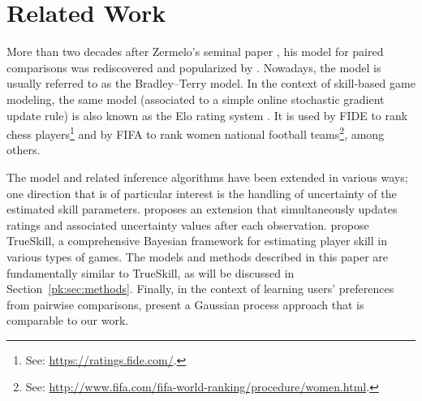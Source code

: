 \section{Related Work}
\label{pk:sec:relwork}

More than two decades after Zermelo's seminal paper \citep{zermelo1928berechnung}, his model for paired comparisons was rediscovered and popularized by \citet{bradley1952rank}.
Nowadays, the model is usually referred to as the Bradley--Terry model.
In the context of skill-based game modeling, the same model (associated to a simple online stochastic gradient update rule) is also known as the Elo rating system \citep{elo1978rating}.
It is used by FIDE to rank chess players\footnote{See: \url{https://ratings.fide.com/}.} and by FIFA to rank women national football teams\footnote{See: \url{http://www.fifa.com/fifa-world-ranking/procedure/women.html}.}, among others.

The model and related inference algorithms have been extended in various ways; one direction that is of particular interest is the handling of uncertainty of the estimated skill parameters.
\citet{glickman1999parameter} proposes an extension that simultaneously updates ratings and associated uncertainty values after each observation.
\citet{herbrich2006trueskill} propose TrueSkill, a comprehensive Bayesian framework for estimating player skill in various types of games.
The models and methods described in this paper are fundamentally similar to TrueSkill, as will be discussed in Section~\ref{pk:sec:methods}.
Finally, in the context of learning users' preferences from pairwise comparisons, \citet{chu2005preference} present a Gaussian process approach that is comparable to our work.
